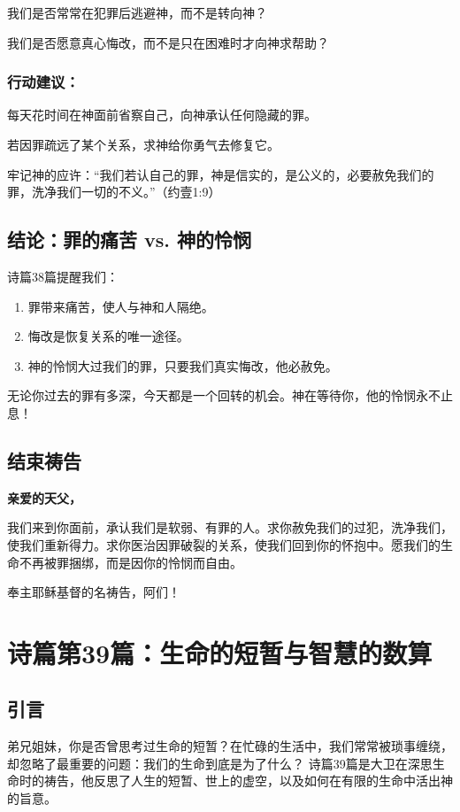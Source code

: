 \documentclass[a4paper, 12pt]{article}
\begin{document}
\hspace{0.6cm}我们是否常常在犯罪后逃避神，而不是转向神？

我们是否愿意真心悔改，而不是只在困难时才向神求帮助？
\subsubsection*{行动建议：}

\hspace{0.6cm}每天花时间在神面前省察自己，向神承认任何隐藏的罪。

若因罪疏远了某个关系，求神给你勇气去修复它。

牢记神的应许：“我们若认自己的罪，神是信实的，是公义的，必要赦免我们的罪，洗净我们一切的不义。”（约壹1:9）
\subsection*{结论：罪的痛苦 vs. 神的怜悯}
诗篇38篇提醒我们：

\begin{enumerate}
    \item 罪带来痛苦，使人与神和人隔绝。

    \item 悔改是恢复关系的唯一途径。

    \item 神的怜悯大过我们的罪，只要我们真实悔改，他必赦免。

    
\end{enumerate}

无论你过去的罪有多深，今天都是一个回转的机会。神在等待你，他的怜悯永不止息！

\subsection*{结束祷告}
\textbf{亲爱的天父，}

我们来到你面前，承认我们是软弱、有罪的人。求你赦免我们的过犯，洗净我们，使我们重新得力。求你医治因罪破裂的关系，使我们回到你的怀抱中。愿我们的生命不再被罪捆绑，而是因你的怜悯而自由。

奉主耶稣基督的名祷告，阿们！
\newpage
\section{诗篇第39篇：生命的短暂与智慧的数算}
\subsection*{引言}
\hspace{0.6cm}弟兄姐妹，你是否曾思考过生命的短暂？在忙碌的生活中，我们常常被琐事缠绕，却忽略了最重要的问题：我们的生命到底是为了什么？ 诗篇39篇是大卫在深思生命时的祷告，他反思了人生的短暂、世上的虚空，以及如何在有限的生命中活出神的旨意。
\end{document}
